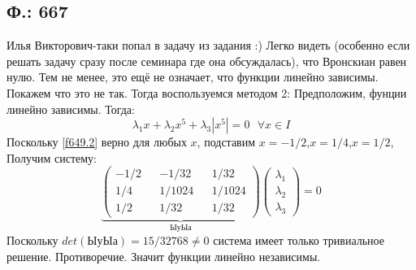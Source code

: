 \documentclass{article}
\begin{document}
\subsection{Ф.: 667}
Илья Викторович-таки попал в задачу из задания :)
Легко видеть (особенно если решать задачу сразу после семинара где она обсуждалась), что Вронскиан равен нулю. Тем не менее, это ещё не означает, что функции линейно зависимы. Покажем что это не так. Тогда воспользуемся методом 2:
Предположим, фунции линейно зависимы. Тогда:
\begin{equation}\label{f649.2}
    \lambda_1 x + \lambda_2 x^5 + \lambda_3 |{x^5}| = 0 \text{ } \forall x \in I
\end{equation}
Поскольку \ref{f649.2} верно для любых $x$, подставим $x=-1/2$,$x=1/4$,$x=1/2$, Получим систему:
\begin{equation}
    \underbrace{
    \begin{pmatrix}
    -1/2 && -1/32 && 1/32\\
    1/4 && 1/1024 && 1/1024\\
    1/2 && 1/32 && 1/32
    \end{pmatrix}}_{\text{ЫуЫа}}
    \begin{pmatrix}
    \lambda_1\\
    \lambda_2\\
    \lambda_3
    \end{pmatrix}
    =0
\end{equation}
 Поскольку $det(\text{ЫуЫа})=15/32768 \neq 0$ система имеет только тривиальное решение. Противоречие. Значит функции линейно независимы.
\end{document}
